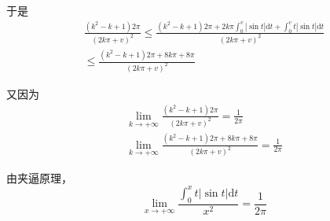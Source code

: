 于是
\begin{gather*}
	\frac{\left( k^{2} -k+1\right) 2\pi }{( 2k\pi +v)^{2}} \leqslant \frac{\left( k^{2} -k+1\right) 2\pi +2k\pi \int _{0}^{v} |\sin t|\mathrm{d} t+\int _{0}^{v} t|\sin t|\mathrm{d} t}{( 2k\pi +v)^{2}}\\
	\leqslant \frac{\left( k^{2} -k+1\right) 2\pi +8k\pi +8\pi }{( 2k\pi +v)^{2}}
\end{gather*}


又因为
\begin{gather*}
	\lim _{k\rightarrow +\infty }\frac{\left( k^{2} -k+1\right) 2\pi }{( 2k\pi +v)^{2}} =\frac{1}{2\pi }\\
	\lim _{k\rightarrow +\infty }\frac{\left( k^{2} -k+1\right) 2\pi +8k\pi +8\pi }{( 2k\pi +v)^{2}} =\frac{1}{2\pi }
\end{gather*}


由夹逼原理，
\begin{equation*}
	\lim _{x\rightarrow +\infty }\frac{\int _{0}^{x} t|\sin t|\mathrm{d} t}{x^{2}} =\frac{1}{2\pi }
\end{equation*}



\ifx\allfiles\undefined

\fi